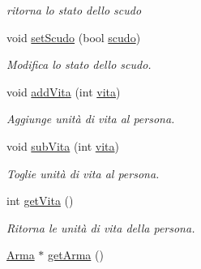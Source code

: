 \begin{DoxyCompactItemize}
\begin{DoxyCompactList}\small\item\em ritorna lo stato dello scudo \end{DoxyCompactList}\item 
void \hyperlink{classPersona_a20449ddc606a872a8905c94fe0ed716a}{set\+Scudo} (bool \hyperlink{classPersona_a1af99e040deeb7015e7e99bb2a5128f4}{scudo})
\begin{DoxyCompactList}\small\item\em Modifica lo stato dello scudo. \end{DoxyCompactList}\item 
void \hyperlink{classPersona_aeca07343f896b49854a6b3eb7acadf99}{add\+Vita} (int \hyperlink{classPersona_a1e784d3a56cddd6ba8e81387df1efc7b}{vita})
\begin{DoxyCompactList}\small\item\em Aggiunge unità di vita al persona. \end{DoxyCompactList}\item 
void \hyperlink{classPersona_af759e5da9d0972da4a74ce6a56e271aa}{sub\+Vita} (int \hyperlink{classPersona_a1e784d3a56cddd6ba8e81387df1efc7b}{vita})
\begin{DoxyCompactList}\small\item\em Toglie unità di vita al persona. \end{DoxyCompactList}\item 
\hypertarget{classPersona_a7f8f0aa7052c06e40ddbbdd4f62f3c4d}{}int \hyperlink{classPersona_a7f8f0aa7052c06e40ddbbdd4f62f3c4d}{get\+Vita} ()\label{classPersona_a7f8f0aa7052c06e40ddbbdd4f62f3c4d}

\begin{DoxyCompactList}\small\item\em Ritorna le unità di vita della persona. \end{DoxyCompactList}\item 
\hypertarget{classPersona_a537b7f6ab867ce01ab850c378bf30cf4}{}\hyperlink{classArma}{Arma} $\ast$ \hyperlink{classPersona_a537b7f6ab867ce01ab850c378bf30cf4}{get\+Arma} ()\label{classPersona_a537b7f6ab867ce01ab850c378bf30cf4}


\end{DoxyCompactItemize}
